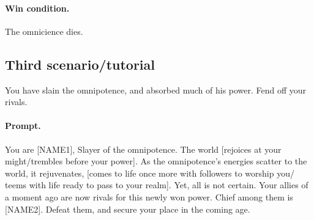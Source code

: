 \documentclass[12pt,letterpaper]{article}
\begin{document}
%

\paragraph{Win condition.}
The omnicience dies.


\subsection{Third scenario/tutorial}
You have slain the omnipotence,
and absorbed much of his power.
Fend off your rivals.

\paragraph{Prompt.}
You are [NAME1], Slayer of the omnipotence.
The world [rejoices at your might/trembles before your power].
As the omnipotence's energies scatter to the world, it rejuvenates,
[comes to life once more with followers to worship you/%
		teems with life ready to pass to your realm].
Yet, all is not certain.
Your allies of a moment ago are now rivals for this newly won power.
Chief among them is [NAME2].
Defeat them, and secure your place in the coming age.

%
\end{document}
